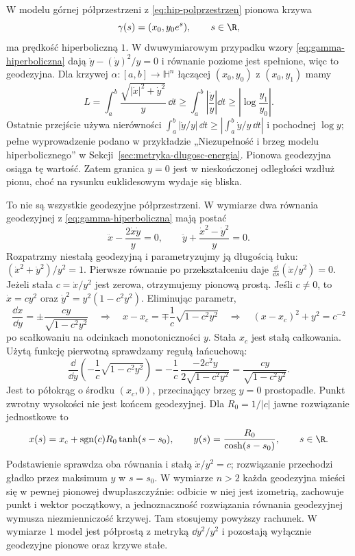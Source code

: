 \begin{przyklad}
\label{prz:geodezyjne-hiperboliczne}
W modelu górnej półprzestrzeni z
\eqref{eq:hip-polprzestrzen} pionowa krzywa
\[
 \gamma(s)=(x_0,y_0e^s),\qquad s\in\R,
\]
ma prędkość hiperboliczną $1$.
W dwuwymiarowym przypadku wzory
\eqref{eq:gamma-hiperboliczna} dają
$\ddot y-(\dot y)^2/y=0$ i równanie
poziome jest spełnione, więc to geodezyjna.
Dla krzywej $\alpha:[a,b]\to\mathbb H^n$ łączącej
$(x_0,y_0)$ z $(x_0,y_1)$ mamy
\[
 L=\int_a^b\frac{\sqrt{|\dot x|^2+\dot y^2}}{y}\,\dd t
 \geq\int_a^b\left|\frac{\dot y}{y}\right|\dd t
 \geq\left|\log\frac{y_1}{y_0}\right|.
\]
Ostatnie przejście używa nierówności
$\int_a^b|\dot y/y|\,\dd t
\geq|\int_a^b\dot y/y\,\dd t|$
i pochodnej $\log y$; pełne wyprowadzenie podano w przykładzie
„Niezupełność i brzeg modelu hiperbolicznego”
w Sekcji~\ref{sec:metryka-dlugosc-energia}.
Pionowa geodezyjna osiąga tę wartość.
Zatem granica $y=0$ jest w nieskończonej
odległości wzdłuż pionu, choć na rysunku
euklidesowym wydaje się bliska.

To nie są wszystkie geodezyjne półprzestrzeni.
W wymiarze dwa równania geodezyjnej z
\eqref{eq:gamma-hiperboliczna} mają postać
\[
 \ddot x-\frac{2\dot x\dot y}{y}=0,
 \qquad
 \ddot y+\frac{\dot x^2-\dot y^2}{y}=0.
\]
Rozpatrzmy niestałą geodezyjną i parametryzujmy ją długością łuku:
$(\dot x^2+\dot y^2)/y^2=1$. Pierwsze równanie
po przekształceniu daje
$\frac{\dd}{\dd s}(\dot x/y^2)=0$.
Jeżeli stała $c=\dot x/y^2$ jest zerowa,
otrzymujemy pionową prostą. Jeśli $c\ne0$,
to $\dot x=cy^2$ oraz
$\dot y^2=y^2(1-c^2y^2)$. Eliminując parametr,
\[
 \frac{\dd x}{\dd y}
   =\pm\frac{cy}{\sqrt{1-c^2y^2}}
 \quad\Longrightarrow\quad
 x-x_c=\mp\frac1c\sqrt{1-c^2y^2}
 \quad\Longrightarrow\quad
 (x-x_c)^2+y^2=c^{-2}
\]
po scałkowaniu na odcinkach monotoniczności $y$.
Stała $x_c$ jest stałą całkowania.
Użytą funkcję pierwotną sprawdzamy regułą łańcuchową:
\[
 \frac{\dd}{\dd y}\left(-\frac1c\sqrt{1-c^2y^2}\right)
 =-\frac1c\,\frac{-2c^2y}{2\sqrt{1-c^2y^2}}
 =\frac{cy}{\sqrt{1-c^2y^2}}.
\]
Jest to półokrąg o środku $(x_c,0)$,
przecinający brzeg $y=0$ prostopadle.
Punkt zwrotny wysokości nie jest końcem geodezyjnej.
Dla $R_0=1/|c|$ jawne rozwiązanie jednostkowe to
\[
 x(s)=x_c+\operatorname{sgn}(c)R_0\tanh(s-s_0),\qquad
 y(s)=\frac{R_0}{\cosh(s-s_0)},\qquad s\in\R.
\]
Podstawienie sprawdza oba równania i stałą $\dot x/y^2=c$;
rozwiązanie przechodzi gładko przez maksimum $y$ w $s=s_0$.
W wymiarze $n>2$ każda geodezyjna mieści się
w pewnej pionowej dwupłaszczyźnie: odbicie
w niej jest izometrią, zachowuje punkt i wektor
początkowy, a jednoznaczność rozwiązania
równania geodezyjnej wymusza niezmienniczość
krzywej. Tam stosujemy powyższy rachunek. W wymiarze $1$
model jest półprostą z metryką $\dd y^2/y^2$ i pozostają
wyłącznie geodezyjne pionowe oraz krzywe stałe.


\end{przyklad}

